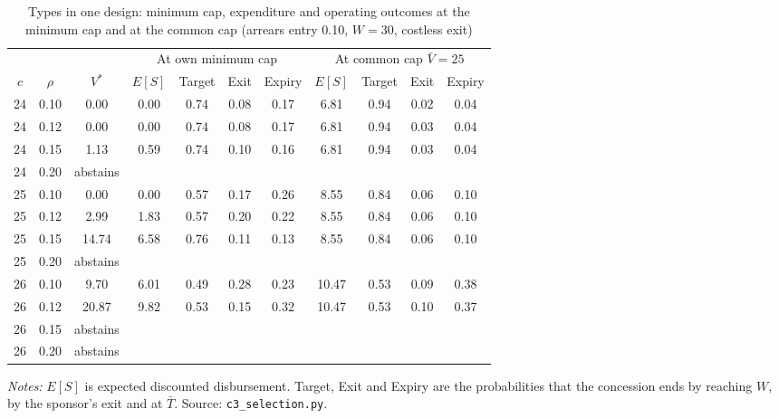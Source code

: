 \begin{table}[htbp]\centering\small
\caption{Types in one design: minimum cap, expenditure and operating outcomes at the minimum cap and at the common cap (arrears entry 0.10, $W = 30$, costless exit)}\label{tab:c3types}
\begin{threeparttable}\begin{tabular}{ccccccccccc}\toprule
 & & & \multicolumn{4}{c}{At own minimum cap} & \multicolumn{4}{c}{At common cap $\bar V = 25$}\\\cmidrule(lr){4-7}\cmidrule(l){8-11}
$c$ & $\rho$ & $V^*$ & $E[S]$ & Target & Exit & Expiry & $E[S]$ & Target & Exit & Expiry\\\midrule
24 & 0.10 & 0.00 & 0.00 & 0.74 & 0.08 & 0.17 & 6.81 & 0.94 & 0.02 & 0.04\\
24 & 0.12 & 0.00 & 0.00 & 0.74 & 0.08 & 0.17 & 6.81 & 0.94 & 0.03 & 0.04\\
24 & 0.15 & 1.13 & 0.59 & 0.74 & 0.10 & 0.16 & 6.81 & 0.94 & 0.03 & 0.04\\
24 & 0.20 & abstains & & & & & & & & \\
25 & 0.10 & 0.00 & 0.00 & 0.57 & 0.17 & 0.26 & 8.55 & 0.84 & 0.06 & 0.10\\
25 & 0.12 & 2.99 & 1.83 & 0.57 & 0.20 & 0.22 & 8.55 & 0.84 & 0.06 & 0.10\\
25 & 0.15 & 14.74 & 6.58 & 0.76 & 0.11 & 0.13 & 8.55 & 0.84 & 0.06 & 0.10\\
25 & 0.20 & abstains & & & & & & & & \\
26 & 0.10 & 9.70 & 6.01 & 0.49 & 0.28 & 0.23 & 10.47 & 0.53 & 0.09 & 0.38\\
26 & 0.12 & 20.87 & 9.82 & 0.53 & 0.15 & 0.32 & 10.47 & 0.53 & 0.10 & 0.37\\
26 & 0.15 & abstains & & & & & & & & \\
26 & 0.20 & abstains & & & & & & & & \\
\bottomrule\end{tabular}
\begin{tablenotes}\footnotesize\item \textit{Notes:} $E[S]$ is expected discounted disbursement. Target, Exit and Expiry are the probabilities that the concession ends by reaching $W$, by the sponsor's exit and at $\bar T$. Source: \texttt{c3\_selection.py}.\end{tablenotes}
\end{threeparttable}\end{table}

